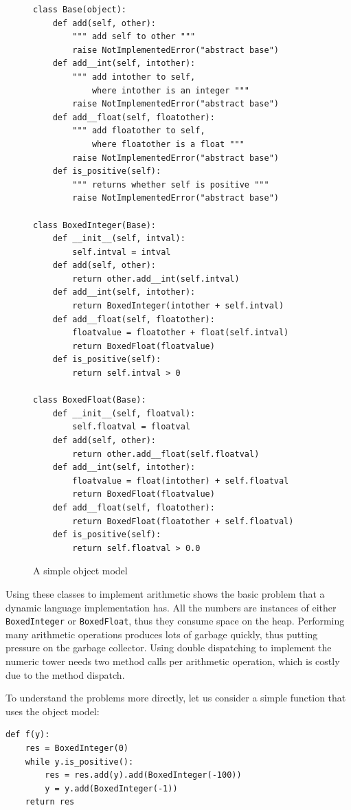 \documentclass{sigplanconf}
\begin{document}
\begin{figure}
\begin{verbatim}
class Base(object):
    def add(self, other):
        """ add self to other """
        raise NotImplementedError("abstract base")
    def add__int(self, intother):
        """ add intother to self,
            where intother is an integer """
        raise NotImplementedError("abstract base")
    def add__float(self, floatother):
        """ add floatother to self,
            where floatother is a float """
        raise NotImplementedError("abstract base")
    def is_positive(self):
        """ returns whether self is positive """
        raise NotImplementedError("abstract base")

class BoxedInteger(Base):
    def __init__(self, intval):
        self.intval = intval
    def add(self, other):
        return other.add__int(self.intval)
    def add__int(self, intother):
        return BoxedInteger(intother + self.intval)
    def add__float(self, floatother):
        floatvalue = floatother + float(self.intval)
        return BoxedFloat(floatvalue)
    def is_positive(self):
        return self.intval > 0

class BoxedFloat(Base):
    def __init__(self, floatval):
        self.floatval = floatval
    def add(self, other):
        return other.add__float(self.floatval)
    def add__int(self, intother):
        floatvalue = float(intother) + self.floatval
        return BoxedFloat(floatvalue)
    def add__float(self, floatother):
        return BoxedFloat(floatother + self.floatval)
    def is_positive(self):
        return self.floatval > 0.0
\end{verbatim}
\caption{A simple object model}
\end{figure}

Using these classes to implement arithmetic shows the basic problem that a
dynamic language implementation has. All the numbers are instances of either
\texttt{BoxedInteger} or \texttt{BoxedFloat}, thus they consume space on the
heap. Performing many arithmetic operations produces lots of garbage quickly,
thus putting pressure on the garbage collector. Using double dispatching to
implement the numeric tower needs two method calls per arithmetic operation,
which is costly due to the method dispatch.

To understand the problems more directly, let us consider a simple function
that uses the object model:

\begin{verbatim}
def f(y):
    res = BoxedInteger(0)
    while y.is_positive():
        res = res.add(y).add(BoxedInteger(-100))
        y = y.add(BoxedInteger(-1))
    return res
\end{verbatim}
\end{document}
